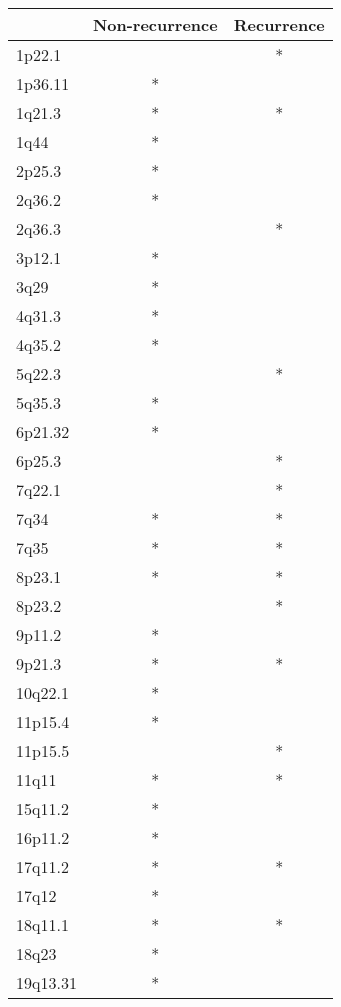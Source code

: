 \begin{tabular}{lcc}
\toprule
{} & Non-recurrence & Recurrence \\
\midrule
1p22.1   &                &          * \\
1p36.11  &              * &            \\
1q21.3   &              * &          * \\
1q44     &              * &            \\
2p25.3   &              * &            \\
2q36.2   &              * &            \\
2q36.3   &                &          * \\
3p12.1   &              * &            \\
3q29     &              * &            \\
4q31.3   &              * &            \\
4q35.2   &              * &            \\
5q22.3   &                &          * \\
5q35.3   &              * &            \\
6p21.32  &              * &            \\
6p25.3   &                &          * \\
7q22.1   &                &          * \\
7q34     &              * &          * \\
7q35     &              * &          * \\
8p23.1   &              * &          * \\
8p23.2   &                &          * \\
9p11.2   &              * &            \\
9p21.3   &              * &          * \\
10q22.1  &              * &            \\
11p15.4  &              * &            \\
11p15.5  &                &          * \\
11q11    &              * &          * \\
15q11.2  &              * &            \\
16p11.2  &              * &            \\
17q11.2  &              * &          * \\
17q12    &              * &            \\
18q11.1  &              * &          * \\
18q23    &              * &            \\
19q13.31 &              * &            \\
\bottomrule
\end{tabular}

